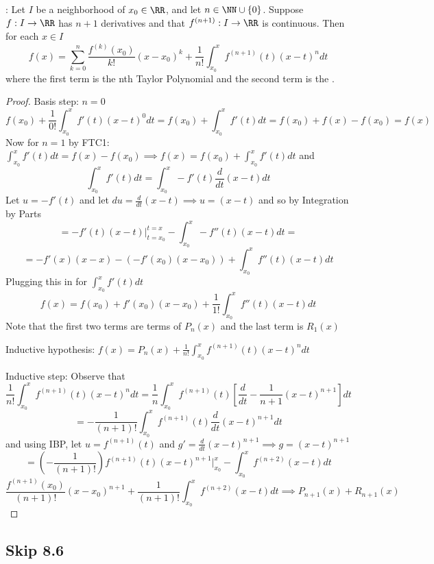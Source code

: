 \documentclass[12pt]{scrartcl}
\begin{document}
\begin{theorem}
  : Let $I$ be a neighborhood of $x_0 \in \RR$, and 
  let $n \in \NN \cup \{0\}$. Suppose $f: I \to \RR$ has $n + 1$ derivatives and that 
  $f^{(n+1)}: I \to \RR$ is continuous. Then for each $x \in I$
  \[f(x) = \sum_{k=0}^n \frac{f^{(k)}(x_0)}{k!}(x-x_0)^k + \frac{1}{n!}\int_{x_0}^x f^{(n+1)}(t)(x-t)^n dt\]
  where the first term is the nth Taylor Polynomial and the second term is the .

  \begin{proof}
    Basis step: $n=0$
    \[f(x_0) + \frac{1}{0!}\int_{x_0}^x f'(t)(x-t)^0 dt = f(x_0) + \int_{x_0}^x f'(t) dt = f(x_0) + f(x) - f(x_0) = f(x)\]
    Now for $n=1$ by FTC1: $\int_{x_0}^x f'(t) dt = f(x) - f(x_0) \implies f(x) = f(x_0) + \int_{x_0}^x f'(t) dt$
    and 
    \[\int_{x_0}^x f'(t) dt = \int_{x_0}^x -f'(t) \frac{d}{dt}(x-t) dt\]
    Let $u = -f'(t)$ and let $du = \frac{d}{dt}(x-t) \implies u = (x-t)$
    and so by Integration by Parts 
    \[= -f'(t) (x-t)\Bigg|_{t=x_0}^{t=x} - \int_{x_0}^x -f''(t) (x-t) dt = \]
    \[= -f'(x)(x-x) - (-f'(x_0)(x-x_0)) + \int_{x_0}^x f''(t) (x-t) dt\]
    Plugging this in for $\int_{x_0}^x f'(t) dt$
    \[f(x) = f(x_0) + f'(x_0)(x-x_0) + \frac{1}{1!}\int_{x_0}^x f''(t) (x-t) dt\]
    Note that the first two terms are terms of $P_n(x)$ and the last term is $R_1(x)$
    
    Inductive hypothesis: $f(x) = P_n(x) + \frac{1}{n!}\int_{x_0}^x f^{(n+1)}(t) (x-t)^n dt$

    Inductive step: Observe that 
    \[\frac{1}{n!}\int_{x_0}^x f^{(n+1)}(t) (x-t)^n dt = \frac{1}{n} \int_{x_0}^x f^{(n+1)}(t) \left[ \frac{d}{dt} -\frac{1}{n+1}(x-t)^{n+1}\right] dt\]
    \[= -\frac{1}{(n+1)!}\int_{x_0}^x f^{(n+1)}(t) \frac{d}{dt}(x-t)^{n+1} dt\]
    and using IBP, let $u = f^{(n+1)}(t)$ and $g' = \frac{d}{dt}(x-t)^{n+1} \implies g = (x-t)^{n+1}$
    \[= (-\frac{1}{(n+1)!}) f^{(n+1)}(t) (x-t)^{n+1}\Bigg|_{x_0}^x - \int_{x_0}^x f^{(n+2)} (x-t) dt\]
    \[\frac{f^{(n+1)}(x_0)}{(n+1)!}(x-x_0)^{n+1} + \frac{1}{(n+1)!}\int_{x_0}^x f^{(n+2)}(x-t) dt \implies P_{n+1}(x) + R_{n+1}(x)\]
  \end{proof}
\end{theorem}

\subsection{Skip 8.6}

\subsection{}

\begin{definition}
  
\end{definition}
\end{document}

